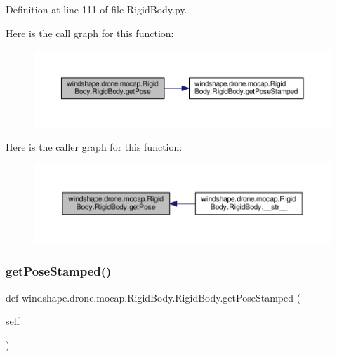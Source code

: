 Definition at line 111 of file Rigid\+Body.\+py.

Here is the call graph for this function\+:\nopagebreak
\begin{figure}[H]
\begin{center}
\leavevmode
\includegraphics[width=350pt]{classwindshape_1_1drone_1_1mocap_1_1_rigid_body_1_1_rigid_body_a253804cb7092d4e5084ba1312dc7219a_cgraph}
\end{center}
\end{figure}
Here is the caller graph for this function\+:\nopagebreak
\begin{figure}[H]
\begin{center}
\leavevmode
\includegraphics[width=350pt]{classwindshape_1_1drone_1_1mocap_1_1_rigid_body_1_1_rigid_body_a253804cb7092d4e5084ba1312dc7219a_icgraph}
\end{center}
\end{figure}
\mbox{\label{classwindshape_1_1drone_1_1mocap_1_1_rigid_body_1_1_rigid_body_ab4db6bb3a66110c7c23370df9eed7a70}} 
\subsubsection{\texorpdfstring{get\+Pose\+Stamped()}{getPoseStamped()}}
{\footnotesize\ttfamily def windshape.\+drone.\+mocap.\+Rigid\+Body.\+Rigid\+Body.\+get\+Pose\+Stamped (\begin{DoxyParamCaption}\item[{}]{self }\end{DoxyParamCaption})}

